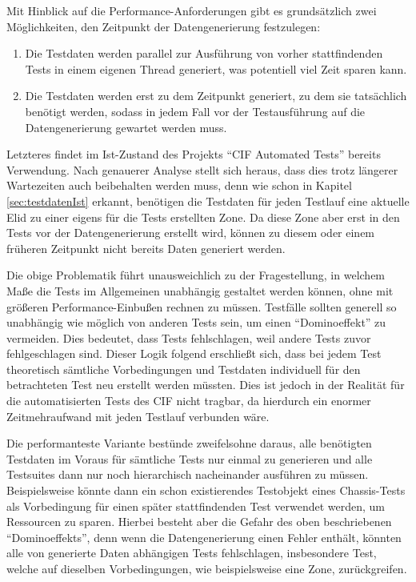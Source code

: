 Mit Hinblick auf die Performance-Anforderungen gibt es grundsätzlich zwei Möglichkeiten, den Zeitpunkt der Datengenerierung festzulegen:

\begin{enumerate}
    \item Die Testdaten werden parallel zur Ausführung von vorher stattfindenden Tests in einem eigenen Thread generiert, was potentiell viel Zeit sparen kann.
    \item Die Testdaten werden erst zu dem Zeitpunkt generiert, zu dem sie tatsächlich benötigt werden, sodass in jedem Fall vor der Testausführung auf die Datengenerierung gewartet werden muss.
\end{enumerate}

Letzteres findet im Ist-Zustand des Projekts \enquote{CIF Automated Tests} bereits Verwendung. Nach genauerer Analyse stellt sich heraus, dass dies trotz längerer Wartezeiten auch beibehalten werden muss, denn wie schon in Kapitel \ref{sec:testdatenIst} erkannt, benötigen die Testdaten für jeden Testlauf eine aktuelle \ac{Elid} zu einer eigens für die Tests erstellten Zone. Da diese Zone aber erst in den Tests vor der Datengenerierung erstellt wird, können zu diesem oder einem früheren Zeitpunkt nicht bereits Daten generiert werden.

Die obige Problematik führt unausweichlich zu der Fragestellung, in welchem Maße die Tests im Allgemeinen unabhängig gestaltet werden können, ohne mit größeren Performance-Einbußen rechnen zu müssen. Testfälle sollten generell so unabhängig wie möglich von anderen Tests sein, um einen \enquote{Dominoeffekt} zu vermeiden. Dies bedeutet, dass Tests fehlschlagen, weil andere Tests zuvor fehlgeschlagen sind. \cite[S. 197]{fewster:1999} Dieser Logik folgend erschließt sich, dass bei jedem Test theoretisch sämtliche Vorbedingungen und Testdaten individuell für den betrachteten Test neu erstellt werden müssten. Dies ist jedoch in der Realität für die automatisierten Tests des \ac{CIF} nicht tragbar, da hierdurch ein enormer Zeitmehraufwand mit jeden Testlauf verbunden wäre. 

Die performanteste Variante bestünde zweifelsohne daraus, alle benötigten Testdaten im Voraus für sämtliche Tests nur einmal zu generieren und alle Testsuites dann nur noch hierarchisch nacheinander ausführen zu müssen. Beispielsweise könnte dann ein schon existierendes Testobjekt eines Chassis-Tests als Vorbedingung für einen später stattfindenden Test verwendet werden, um Ressourcen zu sparen. Hierbei besteht aber die Gefahr des oben beschriebenen \enquote{Dominoeffekts}, denn wenn die Datengenerierung einen Fehler enthält, könnten alle von generierte Daten abhängigen Tests fehlschlagen, insbesondere Test, welche auf dieselben Vorbedingungen, wie beispielsweise eine Zone, zurückgreifen. 

